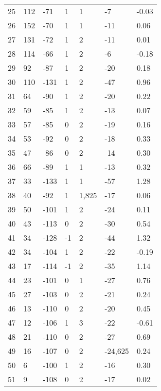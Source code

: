 \begin{appendices}
\begin{longtable}[c]{@{}lllllll@{}}
25 & 112 & -71 & 1 & 1 & -7 & -0.03 \\
26 & 152 & -70 & 1 & 1 & -11 & 0.06 \\
27 & 131 & -72 & 1 & 2 & -11 & 0.01 \\
28 & 114 & -66 & 1 & 2 & -6 & -0.18 \\
\rowcolor[HTML]{FFCCC9}
29 & 92 & -87 & 1 & 2 & -20 & 0.18 \\
30 & 110 & -131 & 1 & 2 & -47 & 0.96 \\
\rowcolor[HTML]{FFCCC9}
31 & 64 & -90 & 1 & 2 & -20 & 0.22 \\
\rowcolor[HTML]{FFCCC9}
32 & 59 & -85 & 1 & 2 & -13 & 0.07 \\
\rowcolor[HTML]{FFCCC9}
33 & 57 & -85 & 0 & 2 & -19 & 0.16 \\
\rowcolor[HTML]{FFCCC9}
34 & 53 & -92 & 0 & 2 & -18 & 0.33 \\
\rowcolor[HTML]{FFCCC9}
35 & 47 & -86 & 0 & 2 & -14 & 0.30 \\
\rowcolor[HTML]{FFCCC9}
36 & 66 & -89 & 1 & 1 & -13 & 0.32 \\
\rowcolor[HTML]{FFCCC9}
37 & 33 & -133 & 1 & 1 & -57 & 1.28 \\
\rowcolor[HTML]{FFCCC9}
38 & 40 & -92 & 1 & 1,825 & -17 & 0.06 \\
\rowcolor[HTML]{FFCCC9}
39 & 50 & -101 & 1 & 2 & -24 & 0.11 \\
\rowcolor[HTML]{FFCCC9}
40 & 43 & -113 & 0 & 2 & -30 & 0.54 \\
\rowcolor[HTML]{FFCCC9}
41 & 34 & -128 & -1 & 2 & -44 & 1.32 \\
\rowcolor[HTML]{FFCCC9}
42 & 34 & -104 & 1 & 2 & -22 & -0.19 \\
\rowcolor[HTML]{FFCCC9}
43 & 17 & -114 & -1 & 2 & -35 & 1.14 \\
\rowcolor[HTML]{FFCCC9}
44 & 23 & -101 & 0 & 1 & -27 & 0.76 \\
\rowcolor[HTML]{FFCCC9}
45 & 27 & -103 & 0 & 2 & -21 & 0.24 \\
\rowcolor[HTML]{FFCCC9}
46 & 13 & -110 & 0 & 2 & -20 & 0.45 \\
\rowcolor[HTML]{FFCCC9}
47 & 12 & -106 & 1 & 3 & -22 & -0.61 \\
\rowcolor[HTML]{FFCCC9}
48 & 21 & -110 & 0 & 2 & -27 & 0.69 \\
\rowcolor[HTML]{FFCCC9}
49 & 16 & -107 & 0 & 2 & -24,625 & 0.24 \\
\rowcolor[HTML]{FFCCC9}
50 & 6 & -100 & 1 & 2 & -16 & 0.30 \\
\rowcolor[HTML]{FFCCC9}
51 & 9 & -108 & 0 & 2 & -17 & 0.02 \\

\end{longtable}
\end{appendices}
